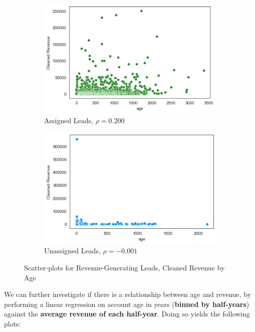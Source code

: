 \documentclass[11pt]{article}
\begin{document}
\begin{figure}[h]
    \centering
    \begin{subfigure}[l]{0.45\textwidth}
         \centering
        \includegraphics[scale=.5]{Images/assigned_scatter_age_vs_cleaned_revenue.png}
         \caption{Assigned Leads, $\rho = 0.200$}
         \label{fig:revenue distribution}
     \end{subfigure}
       \begin{subfigure}[r]{0.4\textwidth}
         \centering
       \includegraphics[scale=.5]{Images/unassigned_scatter_age_vs_cleaned_revenue.png}
         \caption{Unassigned Leads, $\rho = -0.001$}
         \label{fig:date distriburtion}
     \end{subfigure}
    \caption{Scatter-plots for Revenue-Generating Leads, Cleaned Revenue by Age}
    \label{fig:assigned_lead_rev}
\end{figure}

We can further investigate if there is a relationship between age and revenue, by performing a linear regression on account age in years (\textbf{binned by half-years}) against the \textbf{average revenue of each half-year}. Doing so yields the following plots:
\end{document}

